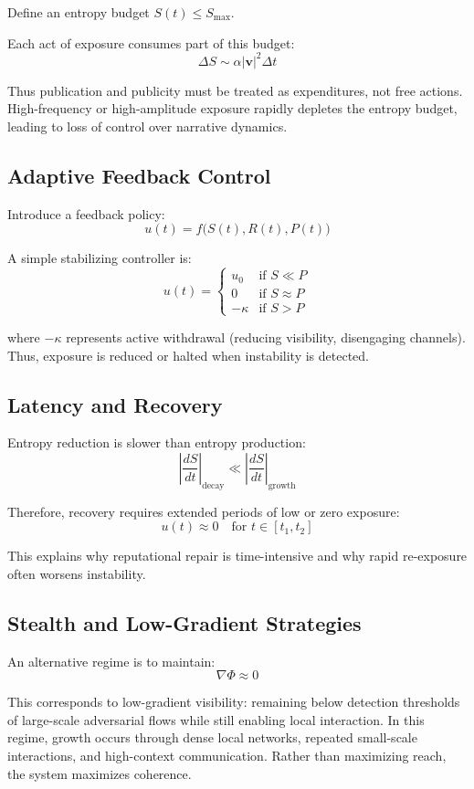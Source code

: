 \documentclass[12pt,a4paper]{article}
\begin{document}
Define an entropy budget $S(t) \leq S_{\max}$.

Each act of exposure consumes part of this budget:
\[
\Delta S \sim \alpha |\mathbf{v}|^2 \Delta t
\]

Thus publication and publicity must be treated as expenditures, not free actions. High-frequency or high-amplitude exposure rapidly depletes the entropy budget, leading to loss of control over narrative dynamics.

\subsection{Adaptive Feedback Control}

Introduce a feedback policy:
\[
u(t) = f\big(S(t), R(t), P(t)\big)
\]

A simple stabilizing controller is:
\[
u(t) =
\begin{cases}
u_0 & \text{if } S \ll P \\
0 & \text{if } S \approx P \\
-\kappa & \text{if } S > P
\end{cases}
\]

where $-\kappa$ represents active withdrawal (reducing visibility, disengaging channels). Thus, exposure is reduced or halted when instability is detected.


\subsection{Latency and Recovery}

Entropy reduction is slower than entropy production:
\[
\left|\frac{dS}{dt}\right|_{\text{decay}} \ll \left|\frac{dS}{dt}\right|_{\text{growth}}
\]

Therefore, recovery requires extended periods of low or zero exposure:
\[
u(t) \approx 0 \quad \text{for } t \in [t_1, t_2]
\]

This explains why reputational repair is time-intensive and why rapid re-exposure often worsens instability.

\subsection{Stealth and Low-Gradient Strategies}

An alternative regime is to maintain:
\[
\nabla \Phi \approx 0
\]

This corresponds to low-gradient visibility: remaining below detection thresholds of large-scale adversarial flows while still enabling local interaction. In this regime, growth occurs through dense local networks, repeated small-scale interactions, and high-context communication. Rather than maximizing reach, the system maximizes coherence.
\end{document}
